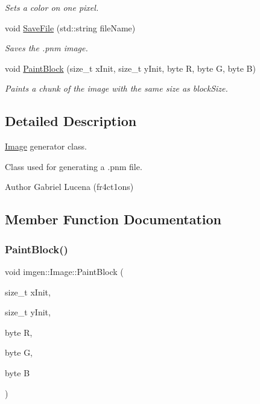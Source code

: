 \begin{DoxyCompactItemize}
\begin{DoxyCompactList}\small\item\em Sets a color on one pixel. \end{DoxyCompactList}\item 
void \hyperlink{classimgen_1_1Image_a7da7330a2fadfa0cac8a52202826b89b}{Save\+File} (std\+::string file\+Name)
\begin{DoxyCompactList}\small\item\em Saves the .pnm image. \end{DoxyCompactList}\item 
void \hyperlink{classimgen_1_1Image_a8c7f6882a085f48d5361c907b4635839}{Paint\+Block} (size\+\_\+t x\+Init, size\+\_\+t y\+Init, byte R, byte G, byte B)
\begin{DoxyCompactList}\small\item\em Paints a chunk of the image with the same size as block\+Size. \end{DoxyCompactList}\end{DoxyCompactItemize}


\subsection{Detailed Description}
\hyperlink{classimgen_1_1Image}{Image} generator class. 

Class used for generating a .pnm file. \begin{DoxyAuthor}{Author}
Gabriel Lucena (fr4ct1ons) 
\end{DoxyAuthor}


\subsection{Member Function Documentation}
\mbox{\label{classimgen_1_1Image_a8c7f6882a085f48d5361c907b4635839}} 
\subsubsection{\texorpdfstring{Paint\+Block()}{PaintBlock()}}
{\footnotesize\ttfamily void imgen\+::\+Image\+::\+Paint\+Block (\begin{DoxyParamCaption}\item[{size\+\_\+t}]{x\+Init,  }\item[{size\+\_\+t}]{y\+Init,  }\item[{byte}]{R,  }\item[{byte}]{G,  }\item[{byte}]{B }\end{DoxyParamCaption})}



